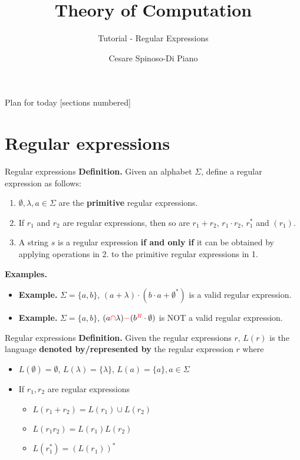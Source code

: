 \documentclass[10pt]{beamer}
\title{Theory of Computation}
\subtitle{Tutorial - Regular Expressions}
\author{Cesare Spinoso-Di Piano}
\date{}
\begin{document}
\maketitle

\begin{frame}{Plan for today}
    [sections numbered]
    \tableofcontents[hideallsubsections]
\end{frame}


\section{Regular expressions}
\begin{frame}{Regular expressions}
    \textbf{Definition.} Given an alphabet $\Sigma$, define a regular expression as follows:
    \begin{enumerate}[1.]
        \item $\emptyset, \lambda, a \in \Sigma$ are the \textbf{primitive} regular expressions.
        \item If $r_1$ and $r_2$ are regular expressions, then so are $r_1+r_2$, $r_1\cdot r_2$, $r_1^*$ and $(r_1)$.
        \item A string $s$ is a regular expression \textbf{if and only if} it can be obtained by applying operations in 2. to the primitive regular expressions in 1.
    \end{enumerate}
    \textbf{Examples.}
    \begin{itemize}
        \item \textbf{Example.} $\Sigma = \{a,b\}$, $(a + \lambda)\cdot(b\cdot a + \emptyset^*)$ is a valid regular expression.
        \item \textbf{Example.} $\Sigma = \{a,b\}$, $(a \textcolor{red}\cap \lambda) \textcolor{red}- (b^{\textcolor{red}R} \cdot \emptyset)$ is NOT a valid regular expression.
    \end{itemize}
\end{frame}

\begin{frame}{Regular expressions}
    \textbf{Definition.} Given the regular expressions $r$, $L(r)$ is the language \textbf{denoted by/represented by} the regular expression $r$ where
    \begin{itemize}
        \item[] $L(\emptyset) = \emptyset$, $L(\lambda) = \{\lambda\}$, $L(a) = \{a\}, a \in \Sigma$
        \item[] If $r_1, r_2$ are regular expressions
            \begin{itemize}
                \item[] $L(r_1+r_2) = L(r_1) \cup L(r_2)$
                \item[] $L(r_1r_2) = L(r_1)L(r_2)$
                \item[] $L(r_1^*) = (L(r_1))^*$
            \end{itemize}
    \end{itemize}

\end{frame}
\end{document}
